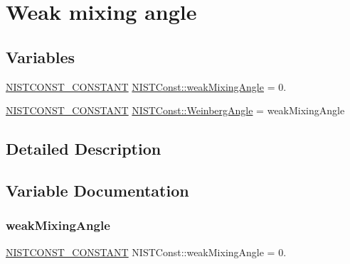 \hypertarget{group___n_i_s_t_const-_weak_mixing_angle}{}\section{Weak mixing angle}
\label{group___n_i_s_t_const-_weak_mixing_angle}
\subsection*{Variables}
\begin{DoxyCompactItemize}
\item 
\mbox{\hyperlink{group___n_i_s_t_const-_macros_ga2b0fc1d7452373f816175dd86ce26729}{N\+I\+S\+T\+C\+O\+N\+S\+T\+\_\+\+C\+O\+N\+S\+T\+A\+NT}} \mbox{\hyperlink{group___n_i_s_t_const-_weak_mixing_angle_ga0dc8fe82146df3a503a0120dc478588a}{N\+I\+S\+T\+Const\+::weak\+Mixing\+Angle}} = 0.
\item 
\mbox{\hyperlink{group___n_i_s_t_const-_macros_ga2b0fc1d7452373f816175dd86ce26729}{N\+I\+S\+T\+C\+O\+N\+S\+T\+\_\+\+C\+O\+N\+S\+T\+A\+NT}} \mbox{\hyperlink{group___n_i_s_t_const-_weak_mixing_angle_gae193aad5033858d3f5c0b44f14961458}{N\+I\+S\+T\+Const\+::\+Weinberg\+Angle}} = weak\+Mixing\+Angle
\end{DoxyCompactItemize}


\subsection{Detailed Description}


\subsection{Variable Documentation}
\mbox{\label{group___n_i_s_t_const-_weak_mixing_angle_ga0dc8fe82146df3a503a0120dc478588a}} 
\subsubsection{\texorpdfstring{weak\+Mixing\+Angle}{weakMixingAngle}}
{\footnotesize\ttfamily \mbox{\hyperlink{group___n_i_s_t_const-_macros_ga2b0fc1d7452373f816175dd86ce26729}{N\+I\+S\+T\+C\+O\+N\+S\+T\+\_\+\+C\+O\+N\+S\+T\+A\+NT}} N\+I\+S\+T\+Const\+::weak\+Mixing\+Angle = 0.}

